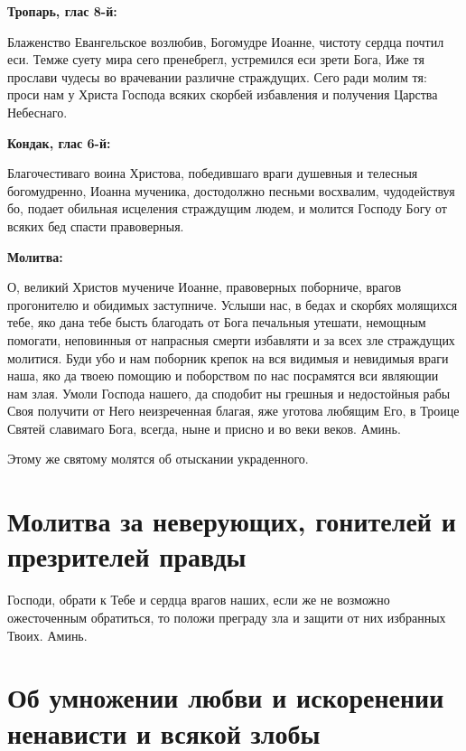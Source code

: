 \bfseries Тропарь, глас 8-й:\normalfont{}


Блаженство Евангельское возлюбив, Богомудре Иоанне, чистоту сердца почтил еси. Темже суету мира сего пренебрегл, устремился еси зрети Бога, Иже тя прослави чудесы во врачевании различне страждущих. Сего ради молим тя: проси нам у Христа Господа всяких скорбей избавления и получения Царства Небеснаго.


\medskip


\bfseries Кондак, глас 6-й:\normalfont{}


Благочестиваго воина Христова, победившаго враги душевныя и телесныя богомудренно, Иоанна мученика, достодолжно песньми восхвалим, чудодействуя бо, подает обильная исцеления страждущим людем, и молится Господу Богу от всяких бед спасти правоверныя.


\medskip


\bfseries Молитва:\normalfont{}


О, великий Христов мучениче Иоанне, правоверных поборниче, врагов прогонителю и обидимых заступниче. Услыши нас, в бедах и скорбях молящихся тебе, яко дана тебе бысть благодать от Бога печальныя утешати, немощным помогати, неповинныя от напрасныя смерти избавляти и за всех зле страждущих молитися. Буди убо и нам поборник крепок на вся видимыя и невидимыя враги наша, яко да твоею помощию и поборством по нас посрамятся вси являющии нам злая. Умоли Господа нашего, да сподобит ны грешныя и недостойныя рабы Своя получити от Него неизреченная благая, яже уготова любящим Его, в Троице Святей славимаго Бога, всегда, ныне и присно и во веки веков. Аминь. 

\itshape 

Этому же святому молятся об отыскании украденного.\normalfont{}


\section{Молитва за неверующих, гонителей и презрителей правды}
 


Господи, обрати к Тебе и сердца врагов наших, если же не возможно ожесточенным обратиться, то положи преграду зла и защити от них избранных Твоих. Аминь.





\section{Об умножении любви и искоренении ненависти и всякой злобы}
 


